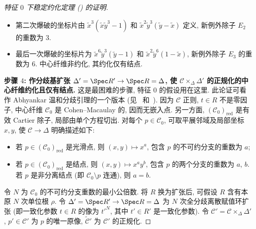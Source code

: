 \begin{proof}[特征 $0$ 下稳定约化定理 () 的证明]
\begin{itemize}
\item 第二次爆破的坐标片由 $\widetilde x^3(\widetilde x\widetilde y^3-1)$ 和 $\widetilde x^2\widetilde y^3(\widetilde y-\widetilde x)$ 定义, 新例外除子 $E_2$ 的重数为 $3$.
\item 最后一次爆破的坐标片为 $\widetilde x^6\widetilde y^3(\widetilde y-1)$ 和 $\widetilde x^2\widetilde y^6(1-\widetilde x)$, 新例外除子 $E_3$ 的重数为 $6$. 中心纤维非约化, 其约化仅有结点.
\end{itemize}
\textbf{步骤 $4$: 作分歧基扩张 $\Delta'=\Spec R'\to\Spec R=\Delta$, 使 $\mathcal C\times_\Delta\Delta'$ 的正规化的中心纤维约化且仅有结点.}
这是最困难的步骤, 特征 $0$ 的假设用在这里. 此论证可看作 Abhyankar 温和分歧引理的一个版本 (见~\cite[\S XIII.5]{SGA1} 和~\cite[Tag 0EXT]{SP}). 因为 $\mathcal C$ 正则, $t\in R$ 不是零因子, 中心纤维 $\mathcal C_0$ 是 Cohen--Macaulay 的, 因而无嵌入点. 另一方面, $(\mathcal C_0)_{\mathrm{red}}$ 是有效 Cartier 除子, 局部由单个方程切出. 对每个 $p\in\mathcal C_0$, 可取平展邻域及局部坐标 $x,\allowbreak y$, 使 $\mathcal C\to\Delta$ 明确描述如下:
\begin{itemize}
\item 若 $p\in(\mathcal C_0)_{\mathrm{red}}$ 是光滑点, 则 $(x,\allowbreak y)\mapsto x^a$, 包含 $p$ 的不可约分支的重数为 $a$;
\item 若 $p\in(\mathcal C_0)_{\mathrm{red}}$ 是结点, 则 $(x,\allowbreak y)\mapsto x^ay^b$, 包含 $p$ 的两个分支的重数为 $a$, $b$. 若 $p$ 是非分离结点 (即 $\mathcal C_0\setminus p$ 连通), 则 $a=b$.
\end{itemize}
令 $N$ 为 $\mathcal C_0$ 的不可约分支重数的最小公倍数. 将 $R$ 换为扩张后, 可假设 $R$ 含有本原 $N$ 次单位根 $\rho$. 令 $\Delta'=\Spec R'\to\Spec R=\Delta$ 为 $N$ 次全分歧离散赋值环扩张 (即一致化参数 $t\in R$ 的像为 $t'^N$, 其中 $t'\in R'$ 是一致化参数). 令 $\mathcal C'=\mathcal C\times_\Delta\Delta'$, $p'\in\mathcal C'$ 为 $p$ 的唯一原像, $\widetilde{\mathcal C}'$ 为 $\mathcal C'$ 的正规化.


\end{proof}
